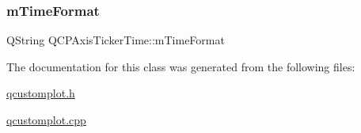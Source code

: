 \mbox{\label{class_q_c_p_axis_ticker_time_a800af3fe0a7c1a8110c043b82169bc9d}} 
\subsubsection{\texorpdfstring{m\+Time\+Format}{mTimeFormat}}
{\footnotesize\ttfamily Q\+String Q\+C\+P\+Axis\+Ticker\+Time\+::m\+Time\+Format\hspace{0.3cm}{\ttfamily [protected]}}



The documentation for this class was generated from the following files\+:\begin{DoxyCompactItemize}
\item 
\hyperlink{qcustomplot_8h}{qcustomplot.\+h}\item 
\hyperlink{qcustomplot_8cpp}{qcustomplot.\+cpp}\end{DoxyCompactItemize}
